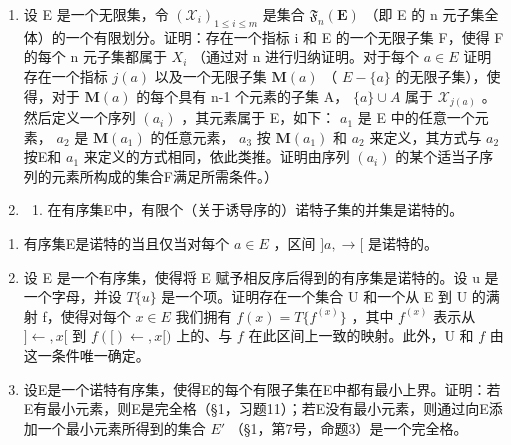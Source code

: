 \begin{enumerate}
\def\labelenumi{\arabic{enumi}.}
\setcounter{enumi}{27}
\item
  设 E 是一个无限集，令 \((\mathcal{X}_{i})_{1\leqslant i\leqslant m}\) 是集合 \(\mathfrak{F}_{n}(\mathbf{E})\) （即 E 的 n 元子集全体）的一个有限划分。证明：存在一个指标 i 和 E 的一个无限子集 F，使得 F 的每个 n 元子集都属于 \(X_{i}\) （通过对 n 进行归纳证明。对于每个 \(a\in E\) 证明存在一个指标 \(j(a)\) 以及一个无限子集 \(\mathbf{M}(a)\) （ \(E-\{a\}\) 的无限子集），使得，对于 \(\mathbf{M}(a)\) 的每个具有 n-1 个元素的子集 A， \(\{a\}\cup A\) 属于 \(\mathcal{X}_{j(a)}\) 。然后定义一个序列 \((a_{i})\) ，其元素属于 E，如下： \(a_{1}\) 是 E 中的任意一个元素， \(a_{2}\) 是 \(\mathbf{M}(a_{1})\) 的任意元素， \(a_{3}\) 按 \(\mathbf{M}(a_{1})\) 和 \(a_{2}\) 来定义，其方式与 \(a_{2}\) 按E和 \(a_{1}\) 来定义的方式相同，依此类推。证明由序列 \((a_{i})\) 的某个适当子序列的元素所构成的集合F满足所需条件。）
\item
  \begin{enumerate}
  \def\labelenumii{(\alph{enumii})}
  \tightlist
  \item
    在有序集E中，有限个（关于诱导序的）诺特子集的并集是诺特的。
  \end{enumerate}
\end{enumerate}

\begin{enumerate}
\def\labelenumi{(\alph{enumi})}
\setcounter{enumi}{1}
\item
  有序集E是诺特的当且仅当对每个 \(a \in E\) ，区间 \(]a, \rightarrow[\) 是诺特的。
\item
  设 E 是一个有序集，使得将 E 赋予相反序后得到的有序集是诺特的。设 u 是一个字母，并设 \(T\{u\}\) 是一个项。证明存在一个集合 U 和一个从 E 到 U 的满射 f，使得对每个 \(x \in E\) 我们拥有 \(f(x) = T\{f^{(x)}\}\) ，其中 \(f^{(x)}\) 表示从 \(]\leftarrow, x[\) 到 \(f([)\leftarrow, x[)\) 上的、与 \(f\) 在此区间上一致的映射。此外，U 和 \(f\) 由这一条件唯一确定。
\item
  设E是一个诺特有序集，使得E的每个有限子集在E中都有最小上界。证明：若E有最小元素，则E是完全格（§1，习题11）；若E没有最小元素，则通过向E添加一个最小元素所得到的集合 \(E'\) （§1，第7号，命题3）是一个完全格。
\end{enumerate}

